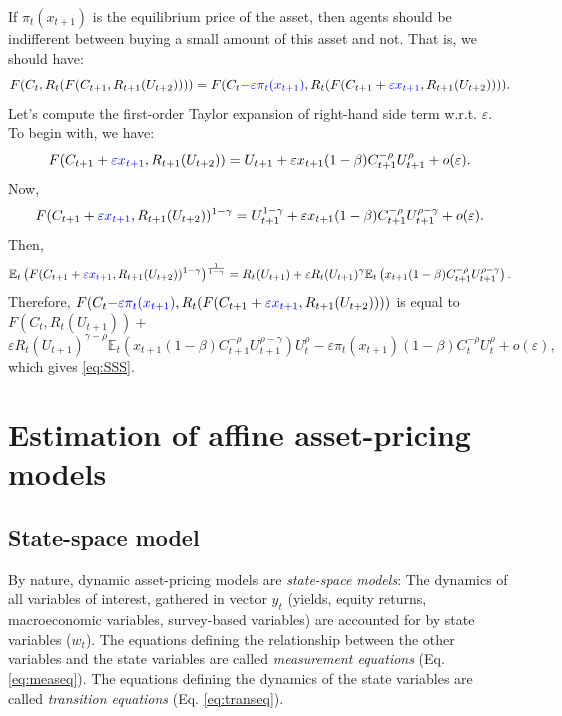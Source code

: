 \documentclass[
  12pt,
]{book}
\theoremstyle{definition}
\theoremstyle{definition}
\theoremstyle{definition}
\theoremstyle{definition}
\theoremstyle{remark}
\begin{document}
If \(\pi_t(x_{t+1})\) is the equilibrium price of the asset, then agents should be indifferent between buying a small amount of this asset and not. That is, we should have:
\[
F(C_t,R_t(F(C_{t+1},R_{t+1}(U_{t+2})))) =
F(C_t {\color{blue} - \varepsilon \pi_t(x_{t+1})},R_t(F(C_{t+1}+{\color{blue}\varepsilon x_{t+1}},R_{t+1}(U_{t+2})))).
\]
Let's compute the first-order Taylor expansion of right-hand side term w.r.t. \(\varepsilon\). To begin with, we have:
\[
F(C_{t+1}+{\color{blue}\varepsilon x_{t+1}},R_{t+1}(U_{t+2})) = U_{t+1} + \varepsilon x_{t+1} (1-\beta) C_{t+1}^{-\rho}U_{t+1}^\rho + o(\varepsilon).
\]
Now,
\[
F(C_{t+1}+{\color{blue}\varepsilon x_{t+1}},R_{t+1}(U_{t+2}))^{1-\gamma} = U_{t+1}^{1-\gamma} + \varepsilon x_{t+1}  (1-\beta) C_{t+1}^{-\rho}U_{t+1}^{\rho-\gamma} + o(\varepsilon).
\]
Then,
\[
\mathbb{E}_t \left( F(C_{t+1}+{\color{blue}\varepsilon x_{t+1}},R_{t+1}(U_{t+2}))^{1-\gamma} \right)^{\frac{1}{1-\gamma}}=R_t(U_{t+1}) + \varepsilon R_t(U_{t+1})^{\gamma} \mathbb{E}_t \left(  x_{t+1} (1-\beta) C_{t+1}^{-\rho} U_{t+1}^{\rho-\gamma} \right).
\]
Therefore, \(F(C_t{\color{blue} - \varepsilon \pi_t(x_{t+1})},R_t(F(C_{t+1}+{\color{blue}\varepsilon x_{t+1}},R_{t+1}(U_{t+2}))))\) is equal to \(F(C_t,R_t(U_{t+1}))+\)
\[
\varepsilon R_t(U_{t+1})^{\gamma - \rho} \mathbb{E}_t \left(  x_{t+1} (1-\beta) C_{t+1}^{-\rho} U_{t+1}^{\rho-\gamma} \right) U_t^{\rho}
- \varepsilon \pi_t(x_{t+1}) (1-\beta) C_t^{-\rho} U_t^{\rho} + o(\varepsilon),
\]
which gives \eqref{eq:SSS}.

\hypertarget{Estimation}{%
\chapter{Estimation of affine asset-pricing models}\label{Estimation}}

\hypertarget{EstimationSSModel}{%
\section{State-space model}\label{EstimationSSModel}}

By nature, dynamic asset-pricing models are \emph{state-space models}: The dynamics of all variables of interest, gathered in vector \(y_t\) (yields, equity returns, macroeconomic variables, survey-based variables) are accounted for by state variables (\(w_t\)). The equations defining the relationship between the other variables and the state variables are called \emph{measurement equations} (Eq. \eqref{eq:measeq}). The equations defining the dynamics of the state variables are called \emph{transition equations} (Eq. \eqref{eq:transeq}).
\end{document}
